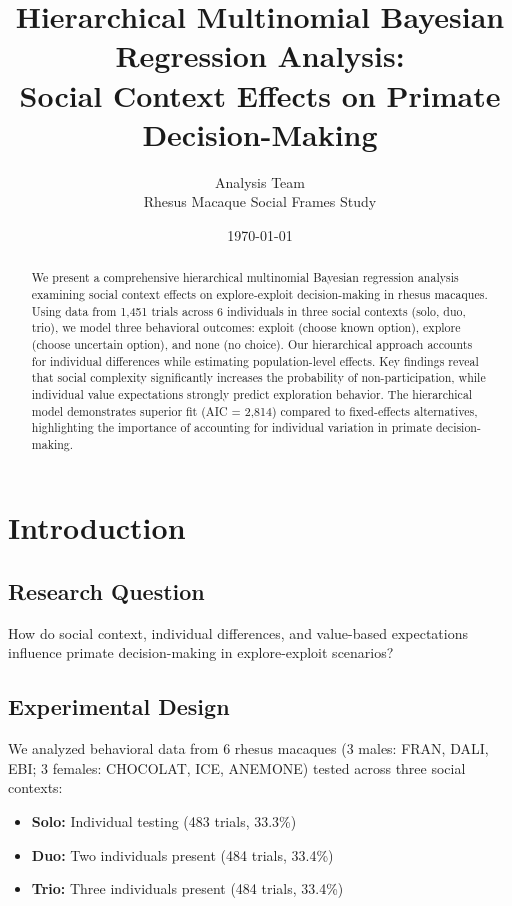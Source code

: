 \documentclass[11pt]{article}
\title{\textbf{Hierarchical Multinomial Bayesian Regression Analysis:\\
Social Context Effects on Primate Decision-Making}}
\author{Analysis Team\\
Rhesus Macaque Social Frames Study}
\date{\today}
\begin{document}
\maketitle

\begin{abstract}
We present a comprehensive hierarchical multinomial Bayesian regression analysis examining social context effects on explore-exploit decision-making in rhesus macaques. Using data from 1,451 trials across 6 individuals in three social contexts (solo, duo, trio), we model three behavioral outcomes: exploit (choose known option), explore (choose uncertain option), and none (no choice). Our hierarchical approach accounts for individual differences while estimating population-level effects. Key findings reveal that social complexity significantly increases the probability of non-participation, while individual value expectations strongly predict exploration behavior. The hierarchical model demonstrates superior fit (AIC = 2,814) compared to fixed-effects alternatives, highlighting the importance of accounting for individual variation in primate decision-making.
\end{abstract}

\tableofcontents
\newpage

\section{Introduction}

\subsection{Research Question}
How do social context, individual differences, and value-based expectations influence primate decision-making in explore-exploit scenarios?

\subsection{Experimental Design}
We analyzed behavioral data from 6 rhesus macaques (3 males: FRAN, DALI, EBI; 3 females: CHOCOLAT, ICE, ANEMONE) tested across three social contexts:
\begin{itemize}
    \item \textbf{Solo:} Individual testing (483 trials, 33.3\%)
    \item \textbf{Duo:} Two individuals present (484 trials, 33.4\%)
    \item \textbf{Trio:} Three individuals present (484 trials, 33.4\%)
\end{itemize}
\end{document}
